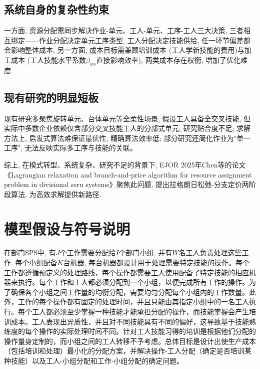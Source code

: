 \documentclass[withoutpreface,bwprint]{cumcmthesis} %
\begin{document}
\subsection{系统自身的复杂性约束}

一方面, 资源分配需同步解决作业-单元、工人-单元、工序-工人三大决策, 三者相互绑定——作业分配决定单元工序类型, 工人分配决定技能供给, 任一环节偏差都会影响整体成本\cite{Chen2025}; 另一方面, 成本目标需兼顾培训成本 (工人学新技能的费用)与加工成本 (工人技能水平系数$\beta_{ws}$直接影响效率), 两类成本存在权衡, 增加了优化难度\cite{Chen2025}. 

\subsection{现有研究的明显短板}

现有研究多聚焦旋转单元、台体单元等全柔性场景, 假设工人具备全交叉技能\cite{Yu2017, Wang2023}, 但实际中多数企业依赖仅含部分交叉技能工人的分部式单元, 研究贴合度不足\cite{Li2023b}; 求解方法上, 启发式算法\cite{Liu2013, Ying2017}难保证最优性, 精确算法\cite{Zhang2022b}效率低; 部分研究还简化作业为"单一工序", 无法反映实际多工序与技能的关联\cite{Wang2024}。

综上, 在模式转型、系统复杂、研究不足的背景下, EJOR 2025年Chen等\cite{Chen2025}的论文《Lagrangian relaxation and branch-and-price algorithm for resource assignment problem in divisional seru systems》聚焦此问题, 提出拉格朗日松弛-分支定价两阶段算法, 为高效求解提供新路径. 

\section{模型假设与符号说明}
在部门SPS中, 有$J$个工作需要分配给$I$个部门小组, 并有$W$名工人负责处理这些工作. 每个小组配备$K$台机器, 每台机器都设计用于处理需要特定技能的操作。每个工作都遵循预定义的处理路线，每个操作都需要工人使用配备了特定技能的相应机器来执行。每个工作和工人都必须分配到一个小组，以便完成所有工作的操作。为了确保各个小组之间工作量的均衡分配，需要均匀分配每个小组内的工作数量。此外，工作的每个操作都有固定的处理时间，并且只能由其指定小组中的一名工人执行。每个工人都必须至少掌握一种技能才能承担分配的操作，而技能掌握会产生培训成本。工人表现出异质性，并且对不同技能具有不同的偏好，这导致基于技能熟练度的每个操作的实际处理时间不同。针对工人技能习得的培训是根据他们分配的操作量身定制的，而小组之间的工人转移不予考虑。总体目标是设计出使生产成本（包括培训和处理）最小化的分配方案，并解决操作-工人分配（确定是否培训某种技能）以及工人-小组分配和工作-小组分配的确定问题。
\end{document}
